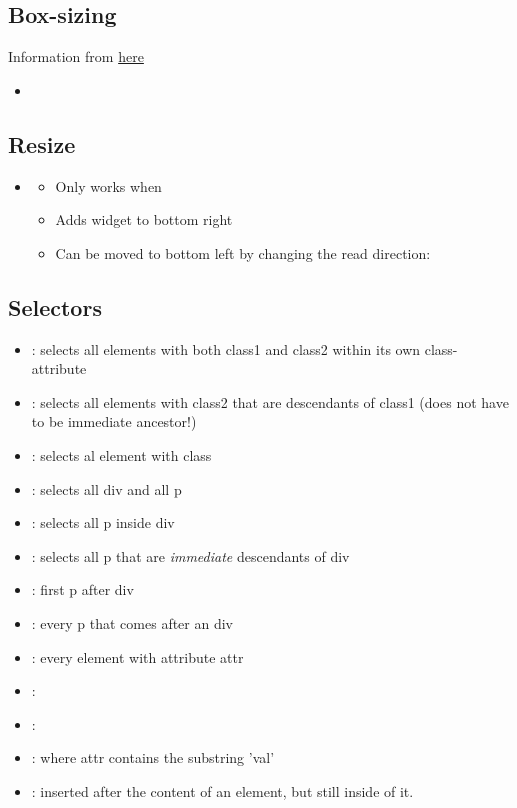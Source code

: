 \subsection{Box-sizing}
Information from \href{https://developer.mozilla.org/en-US/docs/Web/CSS/box-sizing}{here}
\begin{itemize}
    \item 
\end{itemize}

\subsection{Resize}
\begin{itemize}
    \item {} \begin{itemize}
        \item Only works when 
        \item Adds widget to bottom right
        \item Can be moved to bottom left by changing the read direction: 
    \end{itemize}
\end{itemize}

\subsection{Selectors}
\begin{itemize}
    \item {}: selects all elements with both class1 and class2 within its own class-attribute
    \item {}: selects all elements with class2 that are descendants of class1 (does not have to be immediate ancestor!)
    \item {}: selects al element with class
    \item {}: selects all div and all p
    \item {}: selects all p inside div
    \item {}: selects all p that are \emph{immediate} descendants of div
    \item {}: first p after div
    \item {}: every p that comes after an div
    \item \inlinecode{[attr]}: every element with attribute attr
    \item \inlinecode{[attr=val]}:
    \item \inlinecode{[attr~=val]}:
    \item \inlinecode{[attr*=val]}: where attr contains the substring 'val'
    \item {}: inserted after the content of an element, but still inside of it.
\end{itemize}

